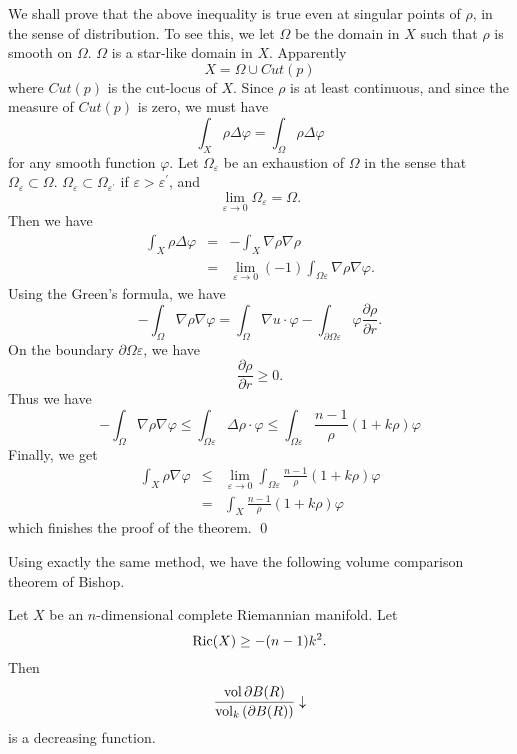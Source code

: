 We shall prove that the above inequality is true even at singular points of $ \rho$, in the sense of distribution. To see this, we let $ \Omega $ be the domain in $X$ such that $\rho$ is smooth on $ \Omega$. $ \Omega$ is a star-like domain in $X$. Apparently
%
\[ X = \Omega \cup C u t (p) \]
%
where $ Cut(p)$ is the cut-locus of $X$. Since $ \rho $ is at least continuous, and since the measure of $ Cut (p) $ is zero, we must have 
%
\[ \int _X \rho \Delta \varphi = \int _{\Omega}  \rho \Delta \varphi \]
%
for any smooth function $ \varphi$.  Let $ \Omega _\varepsilon $ be an exhaustion of $ \Omega $  in the sense that $ \Omega _\varepsilon  \subset \Omega $. $ \Omega _\varepsilon \subset \Omega  _{\varepsilon^{\prime}} $ if $ \varepsilon > \varepsilon ^\prime $, and 
%
\[ \lim_{\varepsilon \rightarrow 0} \Omega _\varepsilon = \Omega. \]
Then we have 
\begin{eqnarray*}
\int_X \rho \Delta \varphi & = & - \int_X \nabla \rho \nabla \rho \\
& = & \lim _{\varepsilon \rightarrow 0} (-1) \int _{ \Omega \varepsilon} \nabla \rho \nabla \varphi .
\end{eqnarray*}
%
Using the Green's formula, we have 
%
\[ - \int _\Omega \nabla \rho \nabla \varphi = \int _ \Omega \nabla u \cdot \varphi - \int _{\partial \Omega \varepsilon } \varphi \frac{\partial \rho}{\partial r} .\]
%
On the boundary $ \partial \Omega \varepsilon$, we have 
%
\[ \frac{\partial \rho}{\partial r} \geq 0 .\]
%
Thus we have 
\[ - \int _\Omega \nabla \rho \nabla \varphi \leq \int _ {\Omega \varepsilon} \Delta  \rho \cdot \varphi \leq   \int _{\Omega \varepsilon } \frac{n-1}{\rho }  ( 1+k\rho)\varphi 
\]
%
Finally, we get 
%
\begin{eqnarray*}
\int_X \rho \nabla \varphi  & \leq & \lim_{\varepsilon \rightarrow 0} \int _{\Omega \varepsilon} \frac{n-1}{\rho} ( 1 + k \rho) \varphi \\
& = & \int_X \frac{n-1}{\rho}(1+ k \rho) \varphi 
\end{eqnarray*}
which finishes the proof of the theorem.
\qed 


Using exactly the same method, we have the following volume comparison theorem of Bishop.

\begin{theorem}Let $X$ be an $n$-dimensional complete Riemannian manifold.  Let 
%
\[ {\rm Ric}(X) \geq - (n-1) k^2 .\]
%
Then
%
\[ \frac{{\rm vol} \, \partial B(R)}{{\rm vol} _k \,( \partial B (R))} \downarrow\]
%
is a decreasing function.
\end{theorem}


